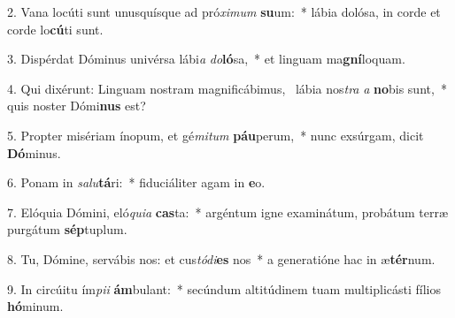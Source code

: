2. Vana locúti sunt unusquísque ad pró\textit{xi}\textit{mum} \textbf{su}um:~*  lábia dolósa, in corde et corde lo\textbf{cú}ti sunt.\

3. Dispérdat Dóminus univérsa lábi\textit{a} \textit{do}\textbf{ló}sa,~*  et linguam ma\textbf{gní}loquam.\

4. Qui dixérunt: Linguam nostram magnificábimus, \dag\  lábia nos\textit{tra} \textit{a} \textbf{no}bis sunt,~*  quis noster Dómi\textbf{nus} est?\

5. Propter misériam ínopum, et gé\textit{mi}\textit{tum} \textbf{páu}perum,~*  nunc exsúrgam, dicit \textbf{Dó}minus.\

6. Ponam in \textit{sa}\textit{lu}\textbf{tá}ri:~*  fiduciáliter agam in \textbf{e}o.\

7. Elóquia Dómini, eló\textit{qui}\textit{a} \textbf{cas}ta:~*  argéntum igne examinátum, probátum terræ purgátum \textbf{sép}tuplum.\

8. Tu, Dómine, servábis nos: et cus\textit{tó}\textit{di}\textbf{es} nos~*  a generatióne hac in æ\textbf{tér}num.\

9. In circúitu ím\textit{pi}\textit{i} \textbf{ám}bulant:~*  secúndum altitúdinem tuam multiplicásti fílios \textbf{hó}minum.\

